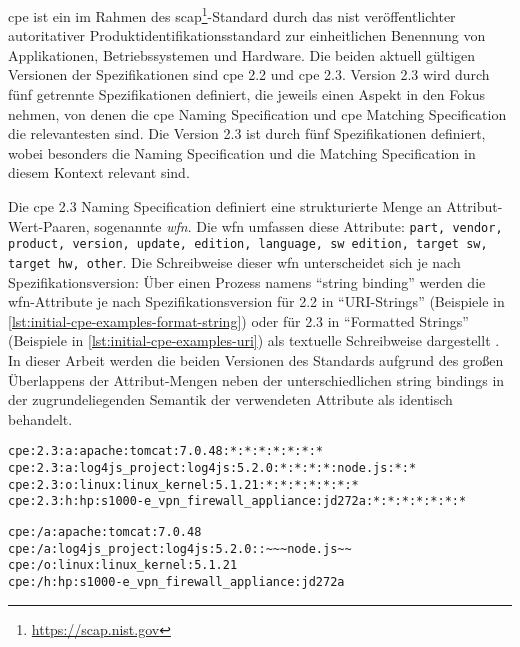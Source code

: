 \acrshort{cpe} ist ein im Rahmen des \acrfull{scap}\footnote{\url{https://scap.nist.gov}}-Standard durch das \acrshort{nist} veröffentlichter autoritativer Produktidentifikationsstandard zur einheitlichen Benennung von Applikationen, Betriebssystemen und Hardware.
Die beiden aktuell gültigen Versionen der Spezifikationen sind \acrshort{cpe} 2.2 und \acrshort{cpe} 2.3.
Version 2.3 wird durch fünf getrennte Spezifikationen definiert, die jeweils einen Aspekt in den Fokus nehmen, von denen die \acrshort{cpe} Naming Specification \autocite{Cheikes_Waltermire_Scarfone_2011} und \acrshort{cpe} Matching Specification \autocite{Parmelee_Booth_Waltermire_Scarfone_2011} die relevantesten sind.
Die Version 2.3 ist durch fünf Spezifikationen definiert, wobei besonders die Naming Specification \autocite{Cheikes_Waltermire_Scarfone_2011} und die Matching Specification \autocite{Parmelee_Booth_Waltermire_Scarfone_2011} in diesem Kontext relevant sind.

Die \acrshort{cpe} 2.3 Naming Specification definiert eine strukturierte Menge an Attribut-Wert-Paaren, sogenannte \textit{\acrfull{wfn}}.
Die \acrshort{wfn} umfassen diese Attribute: \texttt{part, vendor, product, version, update, edition, language, sw edition, target sw, target hw, other}.
Die Schreibweise dieser \acrshort{wfn} unterscheidet sich je nach Spezifikationsversion:
Über einen Prozess namens \enquote{string binding} werden die \acrshort{wfn}-Attribute je nach Spezifikationsversion für 2.2 in \enquote{URI-Strings} (Beispiele in \autoref{lst:initial-cpe-examples-format-string}) oder für 2.3 in \enquote{Formatted Strings} (Beispiele in \autoref{lst:initial-cpe-examples-uri}) als textuelle Schreibweise dargestellt \autocite{Cheikes_Waltermire_Scarfone_2011}.
In dieser Arbeit werden die beiden Versionen des Standards aufgrund des großen Überlappens der Attribut-Mengen neben der unterschiedlichen string bindings in der zugrundeliegenden Semantik der verwendeten Attribute als identisch behandelt.

\begin{lstlisting}[caption=Beispielhafte WFN als CPE 2.3 Format Strings,label=lst:initial-cpe-examples-format-string]
cpe:2.3:a:apache:tomcat:7.0.48:*:*:*:*:*:*:*
cpe:2.3:a:log4js_project:log4js:5.2.0:*:*:*:*:node.js:*:*
cpe:2.3:o:linux:linux_kernel:5.1.21:*:*:*:*:*:*:*
cpe:2.3:h:hp:s1000-e_vpn_firewall_appliance:jd272a:*:*:*:*:*:*:*
\end{lstlisting}

\begin{lstlisting}[caption=Beispielhafte WFN als CPE 2.2 URI,label=lst:initial-cpe-examples-uri]
cpe:/a:apache:tomcat:7.0.48
cpe:/a:log4js_project:log4js:5.2.0::~~~node.js~~
cpe:/o:linux:linux_kernel:5.1.21
cpe:/h:hp:s1000-e_vpn_firewall_appliance:jd272a
\end{lstlisting}

